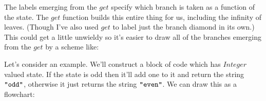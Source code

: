 \documentclass{article}
\newcommand{\Conid}[1]{\mathit{#1}}
\newcommand{\Varid}[1]{\mathit{#1}}
\begin{document}
The labels emerging from the \ensuremath{\Varid{get}} specify which branch is taken as a function of the state. The \ensuremath{\Varid{get}} function builds this entire thing for us, including the infinity of leaves. (Though I've also used \ensuremath{\Varid{get}} to label just the branch diamond in its own.) This could get a little unwieldy so it's easier to draw all of the branches emerging from the \ensuremath{\Varid{get}} by a scheme like:

\begin{center}
\end{center}

Let's consider an example. We'll construct a block of code which has \ensuremath{\Conid{Integer}} valued state. If the state is odd then it'll add one to it and return the string \ensuremath{\text{\tt \char34 odd\char34}}, otherwise it just returns the string \ensuremath{\text{\tt \char34 even\char34}}. We can draw this as a flowchart:

\begin{center}
\end{center}
\end{document}
